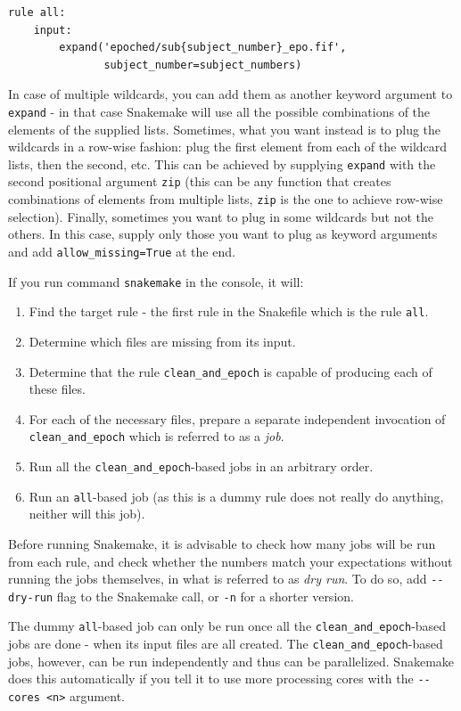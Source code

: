 \documentclass[a4paper,man,floatsintext,natbib]{apa6}
\begin{document}
\begin{verbatim}
rule all:
    input:
        expand('epoched/sub{subject_number}_epo.fif',
               subject_number=subject_numbers)
\end{verbatim}

In case of multiple wildcards, you can add them as another keyword argument to \verb|expand| - in that case Snakemake will use all the possible combinations of the elements of the supplied lists. Sometimes, what you want instead is to plug the wildcards in a row-wise fashion: plug the first element from each of the wildcard lists, then the second, etc. This can be achieved by supplying \verb|expand| with the second positional argument \verb|zip| (this can be any function that creates combinations of elements from multiple lists, \verb|zip| is the one to achieve row-wise selection). Finally, sometimes you want to plug in some wildcards but not the others. In this case, supply only those you want to plug as keyword arguments and add \verb|allow_missing=True| at the end.

If you run command \verb|snakemake| in the console, it will:

\begin{enumerate}
    \item Find the target rule - the first rule in the Snakefile which is the rule \verb|all|.
    \item Determine which files are missing from its input. 
    \item Determine that the rule \verb|clean_and_epoch| is capable of producing each of these files.
    \item For each of the necessary files, prepare a separate independent invocation of \verb|clean_and_epoch| which is referred to as a \emph{job}.
    \item Run all the \verb|clean_and_epoch|-based jobs in an arbitrary order.
    \item Run an \verb|all|-based job (as this is a dummy rule does not really do anything, neither will this job).
\end{enumerate}

Before running Snakemake, it is advisable to check how many jobs will be run from each rule, and check whether the numbers match your expectations without running the jobs themselves, in what is referred to as \emph{dry run}. To do so, add \verb|--dry-run| flag to the Snakemake call, or \verb|-n| for a shorter version.

The dummy \verb|all|-based job can only be run once all the \verb|clean_and_epoch|-based jobs are done - when its input files are all created. The \verb|clean_and_epoch|-based jobs, however, can be run independently and thus can be parallelized. Snakemake does this automatically if you tell it to use more processing cores with the \verb|--cores <n>| argument.
\end{document}
